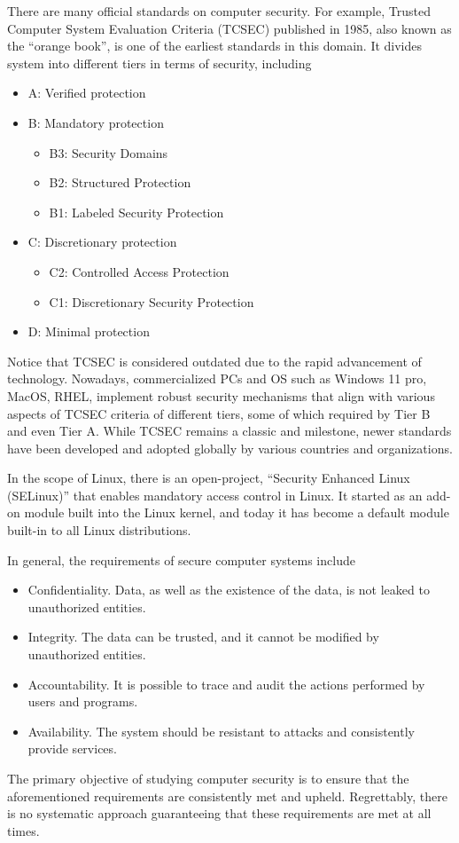 There are many official standards on computer security. For example, Trusted Computer System Evaluation Criteria (TCSEC) published in 1985, also known as the ``orange book'', is one of the earliest standards in this domain. It divides system into different tiers in terms of security, including
\begin{itemize}
	\item A: Verified protection
	\item B: Mandatory protection
	\begin{itemize}
		\item B3: Security Domains
		\item B2: Structured Protection
		\item B1: Labeled Security Protection
	\end{itemize}
	\item C: Discretionary protection
	\begin{itemize}
		\item C2: Controlled Access Protection
		\item C1: Discretionary Security Protection
	\end{itemize}
	\item D: Minimal protection
\end{itemize}
Notice that TCSEC is considered outdated due to the rapid advancement of technology. Nowadays, commercialized PCs and OS such as Windows 11 pro, MacOS, RHEL, implement robust security mechanisms that align with various aspects of TCSEC criteria of different tiers, some of which required by Tier B and even Tier A. While TCSEC remains a classic and milestone, newer standards have been developed and adopted globally by various countries and organizations.

In the scope of Linux, there is an open-project, ``Security Enhanced Linux (SELinux)'' that enables mandatory access control in Linux. It started as an add-on module built into the Linux kernel, and today it has become a default module built-in to all Linux distributions.

In general, the requirements of secure computer systems include
\begin{itemize}
	\item Confidentiality. Data, as well as the existence of the data, is not leaked to unauthorized entities.
	\item Integrity. The data can be trusted, and it cannot be modified by unauthorized entities.
	\item Accountability. It is possible to trace and audit the actions performed by users and programs.
	\item Availability. The system should be resistant to attacks and consistently provide services.
\end{itemize}
The primary objective of studying computer security is to ensure that the aforementioned requirements are consistently met and upheld. Regrettably, there is no systematic approach guaranteeing that these requirements are met at all times.

